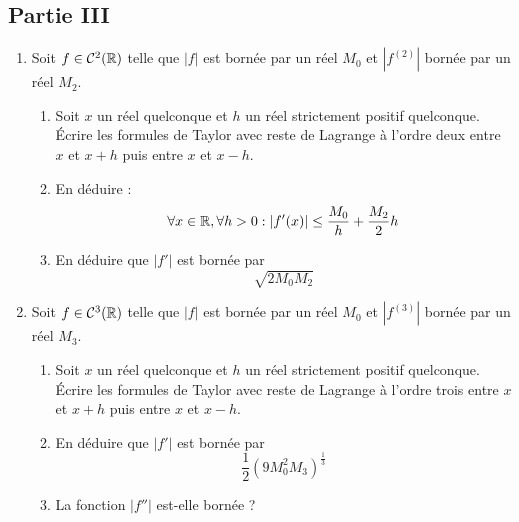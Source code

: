\subsection*{Partie III}
\begin{enumerate}
 \item Soit $f\in\mathcal C^2(\mathbb{R})$ telle que $|f|$ est bornée par un réel $M_0$ et $|f^{(2)}|$ bornée par un réel $M_2$.
\begin{enumerate}
\item Soit $x$ un réel quelconque et $h$ un réel strictement positif quelconque. \'Ecrire les formules de Taylor avec reste de Lagrange à l'ordre deux entre $x$ et $x+h$ puis entre $x$ et $x-h$.
\item En déduire :
\begin{displaymath}
 \forall x\in \mathbb{R}, \forall h> 0 : |f'(x)|\leq
\dfrac{M_0}{h}+\dfrac{M_2}{2}h
\end{displaymath}
\item En déduire que $|f'|$ est bornée par
\begin{displaymath}
 \sqrt{2M_0M_2}
\end{displaymath}
\end{enumerate}

\item Soit $f\in\mathcal C^3(\mathbb{R})$ telle que $|f|$ est bornée par un réel $M_0$ et $|f^{(3)}|$ bornée par un réel $M_3$.
\begin{enumerate}
\item Soit $x$ un réel quelconque et $h$ un réel strictement positif quelconque. \'Ecrire les formules de Taylor avec reste de Lagrange à l'ordre trois entre $x$ et $x+h$ puis entre $x$ et $x-h$.
\item En déduire que $|f'|$ est bornée par
\begin{displaymath}
 \dfrac{1}{2}\left(9M_0^2M_3 \right)^{\frac{1}{3}} 
\end{displaymath}
\item La fonction $|f''|$ est-elle bornée ?
\end{enumerate}
\end{enumerate}

